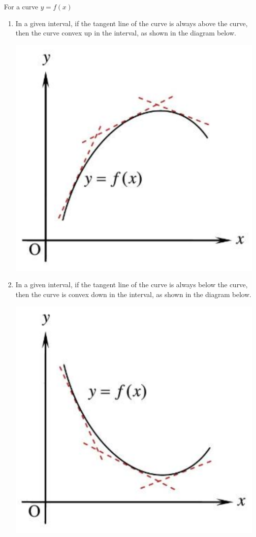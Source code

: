 \documentclass{report}
\begin{document}
For a curve $y = f(x)$
\begin{enumerate}
    \item In a given interval, if the tangent line of the curve is always above the
          curve, then the curve convex up in the interval, as shown in the diagram below.
          \begin{center}
              \includegraphics[scale=0.25]{assets/26-12.png}
          \end{center}
    \item In a given interval, if the tangent line of the curve is always below the
          curve, then the curve is convex down in the interval, as shown in the diagram
          below.
          \begin{center}
              \includegraphics[scale=0.25]{assets/26-13.png}
          \end{center}
\end{enumerate}
\end{document}
